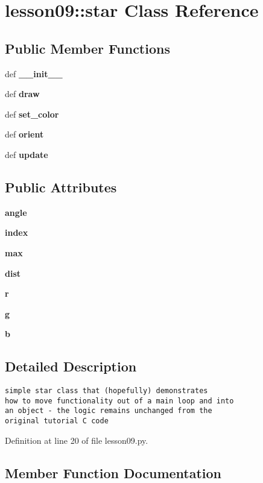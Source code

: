 \section{lesson09::star Class Reference}
\label{classlesson09_1_1star}
\subsection*{Public Member Functions}
\begin{CompactItemize}
\item 
def {\bf \_\-\_\-init\_\-\_\-}
\item 
def {\bf draw}
\item 
def {\bf set\_\-color}
\item 
def {\bf orient}
\item 
def {\bf update}
\end{CompactItemize}
\subsection*{Public Attributes}
\begin{CompactItemize}
\item 
{\bf angle}
\item 
{\bf index}
\item 
{\bf max}
\item 
{\bf dist}
\item 
{\bf r}
\item 
{\bf g}
\item 
{\bf b}
\end{CompactItemize}


\subsection{Detailed Description}


\footnotesize\begin{verbatim}simple star class that (hopefully) demonstrates
how to move functionality out of a main loop and into
an object - the logic remains unchanged from the
original tutorial C code\end{verbatim}
\normalsize
 

Definition at line 20 of file lesson09.py.

\subsection{Member Function Documentation}
